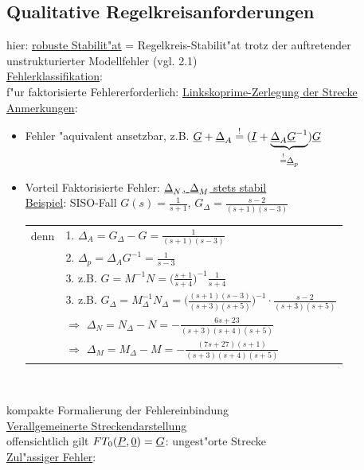 \documentclass[openany,a4paper,11pt]{book}
\begin{document}
\subsection{Qualitative Regelkreisanforderungen}
hier: \uline{robuste Stabilit"at} = Regelkreis-Stabilit"at trotz der auftretender unstrukturierter Modellfehler (vgl. 2.1)\\
\uline{Fehlerklassifikation}: \\
f"ur faktorisierte Fehlererforderlich: \uline{Linkskoprime-Zerlegung der Strecke} \\
\uline{Anmerkungen}: \begin{itemize}
    \item Fehler "aquivalent ansetzbar, z.B. $\uline{G}+\uline{\Delta}_A\stackrel{!}{=}(\uline{I}+\underbrace{\uline{\Delta}_A\uline{G}^{-1}}_{\stackrel{!}{=}\uline{\Delta}_p})\uline{G}$
    \item Vorteil Faktorisierte Fehler: \uline{$\uline{\Delta}_N$, $\uline{\Delta}_M$ stets stabil}\\[5pt]
    \uline{Beispiel}: SISO-Fall $\displaystyle G(s)=\frac{1}{s+1}$, $\displaystyle G_\Delta=\frac{s-2}{(s+1)(s-3)}$
    \begin{tabular}{ll}
        denn & 1. $\displaystyle\Delta_A=G_\Delta- G=\frac{1}{(s+1)(s-3)}$\\
        & 2. $\displaystyle \Delta_p=\Delta_AG^{-1}=\frac{1}{s-3}$\\
        & 3. z.B. $\displaystyle G=M^{-1}N=\bigg(\frac{s+1}{s+4}\bigg)^{-1}\frac{1}{s+4}$ \\
        & {\color{white}3. z.B.}  $\displaystyle G_\Delta=M_\Delta^{-1}N_\Delta=\bigg(\frac{(s+1)(s-3)}{(s+3)(s+5)}\bigg)^{-1}\cdot\frac{s-2}{(s+3)(s+5)}$\\
        & $\Rightarrow$ $\displaystyle \Delta_N=N_\Delta-N=-\frac{6s+23}{(s+3)(s+4)(s+5)}$\\
        & {\color{white}$\Rightarrow$} $\displaystyle\Delta_M=M_\Delta-M=-\frac{(7s+27)(s+1)}{(s+3)(s+4)(s+5)}$
    \end{tabular}\\
\end{itemize}
kompakte Formalierung der Fehlereinbindung\\
\uline{Verallgemeinerte Streckendarstellung} \\
offensichtlich gilt $FT_0(\uline{P},\uline{0})=\uline{G}$: ungest"orte Strecke\\
\uline{Zul"assiger Fehler}:\\[3pt]
\end{document}
